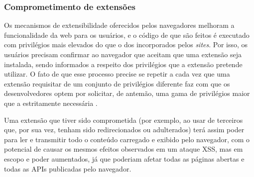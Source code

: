 
\subsubsection{Comprometimento de extensões}
Os mecanismos de extensibilidade oferecidos pelos navegadores melhoram a funcionalidade da web para os usuários, e o código de que são feitos é executado com privilégios mais elevados do que o dos {\scripts} incorporados pelos \textit{sites}. Por isso, os usuários precisam confirmar ao navegador que aceitam que uma extensão seja instalada, sendo informados a respeito dos privilégios que a extensão pretende utilizar. O fato de que esse processo precise se repetir a cada vez que uma extensão requisitar de um conjunto de privilégios diferente faz com que os desenvolvedores optem por solicitar, de antemão, uma gama de privilégios maior que a estritamente necessária \cite{Heule2015_Most_Dangerous_Code}.

Uma extensão que tiver sido comprometida (por exemplo, ao usar {\scripts} de terceiros que, por sua vez, tenham sido redirecionados ou adulterados) terá assim poder para ler e transmitir todo o conteúdo carregado e exibido pelo navegador, com o potencial de causar os mesmos efeitos observados em um ataque XSS, mas em escopo e poder aumentados, já que poderiam afetar todas as páginas abertas e todas as APIs publicadas pelo navegador.
